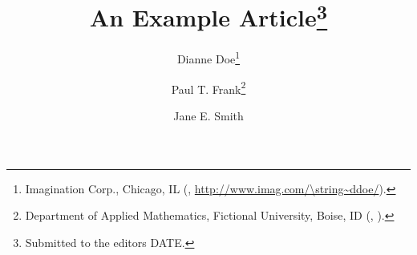 

\usepackage{lipsum}
\usepackage{amsfonts}
\usepackage{graphicx}
\usepackage{epstopdf}
\usepackage{algorithmic}
\ifpdf
\else
\fi

\usepackage{enumitem}

\newcommand{\creflastconjunction}{, and~}



\title{An Example Article\thanks{Submitted to the editors DATE.
}}

\author{Dianne Doe\thanks{Imagination Corp., Chicago, IL 
  (, \url{http://www.imag.com/\string~ddoe/}).}
\and Paul T. Frank\thanks{Department of Applied Mathematics, Fictional University, Boise, ID 
  (, ).}
\and Jane E. Smith\footnotemark[3]}

\usepackage{amsopn}
\DeclareMathOperator{\diag}{diag}


\makeatletter
\newcommand*{\addFileDependency}[1]{%
  \typeout{(#1)}%
  \@addtofilelist{#1}%
  \IfFileExists{#1}{}{\typeout{No file #1.}}%
}
\makeatother

\newcommand*{\myexternaldocument}[1]{%
    \addFileDependency{#1.tex}%
    \addFileDependency{#1.aux}%
}

